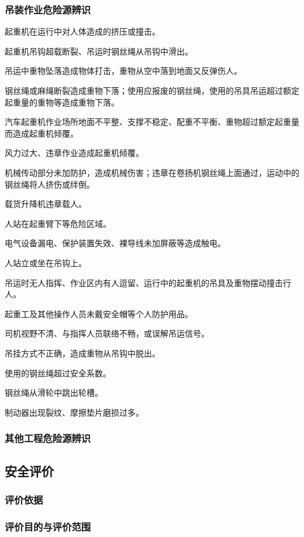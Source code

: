\subsubsection{吊装作业危险源辨识}

 起重机在运行中对人体造成的挤压或撞击。

 起重机吊钩超载断裂、吊运时钢丝绳从吊钩中滑出。

 吊运中重物坠落造成物体打击，重物从空中落到地面又反弹伤人。

 钢丝绳或麻绳断裂造成重物下落；使用应报废的钢丝绳，使用的吊具吊运超过额定起重量的重物等造成重物下落。

 汽车起重机作业场所地面不平整、支撑不稳定、配重不平衡、重物超过额定起重量而造成起重机倾覆。

 风力过大、违章作业造成起重机倾覆。

 机械传动部分未加防护，造成机械伤害；违章在卷扬机钢丝绳上面通过，运动中的钢丝绳将人挤伤或绊倒。

 载货升降机违章载人。

 人站在起重臂下等危险区域。

 电气设备漏电、保护装置失效、裸导线未加屏蔽等造成触电。

 人站立或坐在吊钩上。

 吊运时无人指挥、作业区内有人逗留、运行中的起重机的吊具及重物摆动撞击行人。

 起重工及其他操作人员未戴安全帽等个人防护用品。

 司机视野不清、与指挥人员联络不畅，或误解吊运信号。

 吊挂方式不正确，造成重物从吊钩中脱出。

 使用的钢丝绳超过安全系数。

 钢丝绳从滑轮中跳出轮槽。

 制动器出现裂纹、摩擦垫片磨损过多。

\subsubsection{其他工程危险源辨识}
\subsection{安全评价}
\subsubsection{评价依据}
\subsubsection{评价目的与评价范围}
